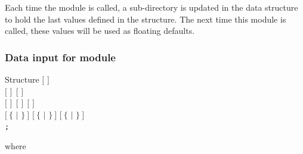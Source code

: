 Each time the  module is called, a sub-directory is updated in the
 data structure to hold the last values defined in the
 structure. The next time this module is called,
these values will be used as floating defaults.

\subsubsection{Data input for module }\label{sect:desctone}

\begin{DataStructure}{Structure }
$[$   $]$ \\
$[$    $]~~[$    $]$ \\
$[$   $]~~[$   $]~~[$   $]$ \\
$[~\{$  $|$  $\}~]$
$[~\{$  $|$  $\}~]$
$[~\{$  $|$  $\}~]$ \\
{\tt ;}
\end{DataStructure}

\noindent 
where

